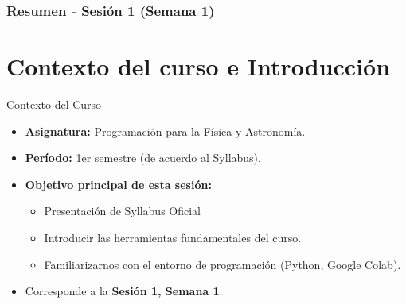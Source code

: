 \documentclass[10pt]{beamer}
\begin{document}
\myfront{}


\begin{frame}
  \titlepage
\end{frame}

\begin{frame}
  \frametitle{Resumen - Sesión 1 (Semana 1)}
  \tableofcontents
\end{frame}


\section{Contexto del curso e Introducción}


\begin{frame}{Contexto del Curso}
  \begin{itemize}
    \item \textbf{Asignatura:} Programación para la Física y Astronomía.
    \item \textbf{Período:} 1er semestre (de acuerdo al Syllabus).
    \item \textbf{Objetivo principal de esta sesión:}
      \begin{itemize}
        \item Presentación de Syllabus Oficial
        \item Introducir las herramientas fundamentales del curso.
        \item Familiarizarnos con el entorno de programación (Python, Google Colab).
      \end{itemize}
    \item Corresponde a la \textbf{Sesión 1, Semana 1}.
  \end{itemize}
\end{frame}
\end{document}
